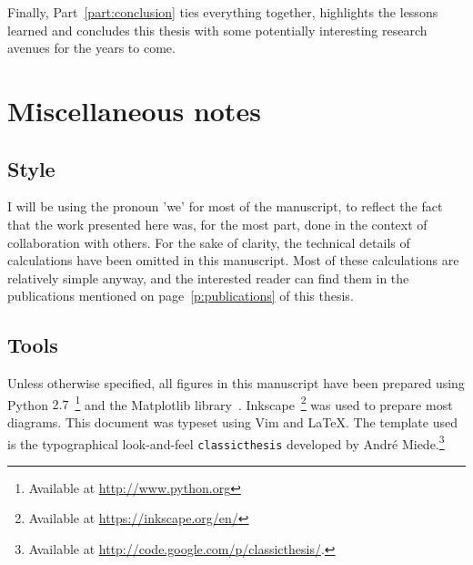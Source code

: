 Finally, Part~\ref{part:conclusion} ties everything together, highlights the lessons
learned and concludes this thesis with some potentially interesting research avenues for the
years to come.



\section{Miscellaneous notes}

\subsection{Style}
\label{sub:style}

I will be using the pronoun 'we' for most of the manuscript, to reflect the fact
that the work presented here was, for the most part, done in the context of
collaboration with others. For the sake of clarity, the technical details of
calculations have been omitted in this manuscript. Most of these calculations are
relatively simple anyway, and the interested reader can find them in the
publications mentioned on page~\ref{p:publications} of this thesis.

\subsection{Tools}
\label{sub:tools}

Unless otherwise specified, all figures in this manuscript have been prepared
using Python $2.7$~\footnote{Available at \url{http://www.python.org}} and the
Matplotlib library~\cite{Hunter:2007}. Inkscape~\footnote{Available at
\url{https://inkscape.org/en/}} was used to prepare most diagrams. This document
was typeset using Vim and \LaTeX. The template used is the typographical look-and-feel
\texttt{classicthesis} developed by Andr\'e
Miede.\footnote{Available at 
\url{http://code.google.com/p/classicthesis/}.}

\begin{center}
\end{center}

